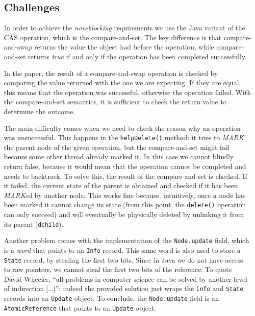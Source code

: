 \documentclass[a4paper,draft,12pt]{article}
\begin{document}
\subsection{Challenges} %
\label{ssec:challenges}

In order to achieve the \emph{non-blocking} requirements we use the Java variant of the \acf{CAS} operation, which is the compare-and-set.
The key difference is that compare-and-swap returns the value the object had before the operation, while compare-and-set returns \emph{true} if and only if the operation has been completed successfully.

In the paper, the result of a compare-and-swap operation is checked by comparing the value returned with the one we are expecting. If they are equal, this means that the operation was successful, otherwise the operation failed.
With the compare-and-set semantics, it is sufficient to check the return value to determine the outcome.

The main difficulty comes when we need to check the reason why an operation was unsuccessful.
This happens in the \texttt{helpDelete()} method: it tries to \emph{MARK} the parent node of the given operation, but the compare-and-set might fail because some other thread already marked it.
In this case we cannot blindly return false, because it would mean that the operation cannot be completed and needs to backtrack.
To solve this, the result of the compare-and-set is checked. If it failed, the current state of the parent is obtained and checked if it has been \emph{MARK}ed by another node.
This works fine because, intuitively, once a node has been marked it cannot change its state (from this point, the \texttt{delete()} operation can only succeed) and will eventually be physically deleted by unlinking it from its parent (\texttt{dchild}).

Another problem comes with the implementation of the \texttt{Node.update} field, which is a \emph{word} that points to an \texttt{Info} record. This same word is also used to store a \texttt{State} record, by stealing the first two bits. Since in Java we do not have access to raw pointers, we cannot steal the first two bits of the reference. To quote David Wheeler, ``all problems in computer science can be solved by another level of indirection [...]'': indeed the provided solution just wraps the \texttt{Info} and \texttt{State} records into an \texttt{Update} object. To conclude, the \texttt{Node.update} field is an \texttt{Atomic\-Reference} that points to an \texttt{Update} object.
\end{document}
